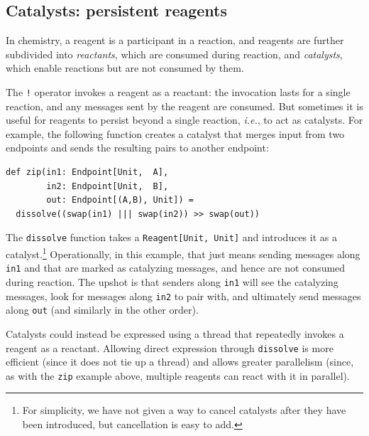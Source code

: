 \documentclass[preprint,nocopyrightspace]{sigplanconf}
\begin{document}

\subsection{Catalysts: persistent reagents}
\label{sec:catalysts}

In chemistry, a reagent is a participant in a reaction, and reagents are
further subdivided into \emph{reactants}, which are consumed during reaction,
and \emph{catalysts}, which enable reactions but are not consumed by them.

The \lstinline{!} operator invokes a reagent as a reactant: the invocation
lasts for a single reaction, and any messages sent by the reagent are
consumed.  But sometimes it is useful for reagents to persist beyond a single
reaction, \emph{i.e.}, to act as catalysts.  For example, the following
function creates a catalyst that merges input from two endpoints and sends the
resulting pairs to another endpoint:
\begin{lstlisting}
def zip(in1: Endpoint[Unit,  A], 
        in2: Endpoint[Unit,  B], 
        out: Endpoint[(A,B), Unit]) = 
  dissolve((swap(in1) ||| swap(in2)) >> swap(out))
\end{lstlisting}
The \lstinline{dissolve} function takes a \lstinline{Reagent[Unit, Unit]} and
introduces it as a catalyst.\footnote{For simplicity, we have not given a way
  to cancel catalysts after they have been introduced, but cancellation is
  easy to add.}  Operationally, in this example, that just means sending
messages along \lstinline{in1} and  that are marked as
catalyzing messages, and hence are not consumed during reaction.  The upshot
is that senders along \lstinline{in1} will see the catalyzing messages, look
for messages along \lstinline{in2} to pair with, and ultimately send messages
along \lstinline{out} (and similarly in the other order).

Catalysts could instead be expressed using a thread that repeatedly invokes a
reagent as a reactant.  Allowing direct expression through
\lstinline{dissolve} is more efficient (since it does not tie up a thread) and
allows greater parallelism (since, as with the \lstinline{zip} example above,
multiple reagents can react with it in parallel).
\end{document}
